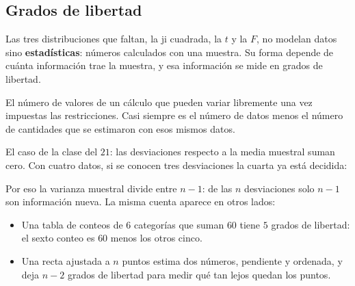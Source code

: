 \documentclass[11pt,letterpaper]{article}
\begin{document}

\subsection*{Grados de libertad}

Las tres distribuciones que faltan, la ji cuadrada, la $t$ y la $F$, no
modelan datos sino \textbf{estadísticas}: números calculados con una
muestra. Su forma depende de cuánta información trae la muestra, y esa
información se mide en grados de libertad.

\begin{definicion}
    El número de valores de un cálculo que pueden variar libremente
    una vez impuestas las restricciones. Casi siempre es el número de
    datos menos el número de cantidades que se estimaron con esos
    mismos datos.
\end{definicion}

El caso de la clase del $21$: las desviaciones respecto a la media
muestral suman cero. Con cuatro datos, si se conocen tres desviaciones
la cuarta ya está decidida:

\begin{center}
\end{center}

Por eso la varianza muestral divide entre $n - 1$: de las $n$
desviaciones solo $n - 1$ son información nueva. La misma cuenta
aparece en otros lados:

\begin{itemize}[itemsep=0.3em]
    \item Una tabla de conteos de $6$ categorías que suman $60$ tiene
          $5$ grados de libertad: el sexto conteo es $60$ menos los
          otros cinco.
    \item Una recta ajustada a $n$ puntos estima dos números,
          pendiente y ordenada, y deja $n - 2$ grados de libertad para
          medir qué tan lejos quedan los puntos.
\end{itemize}
\end{document}
